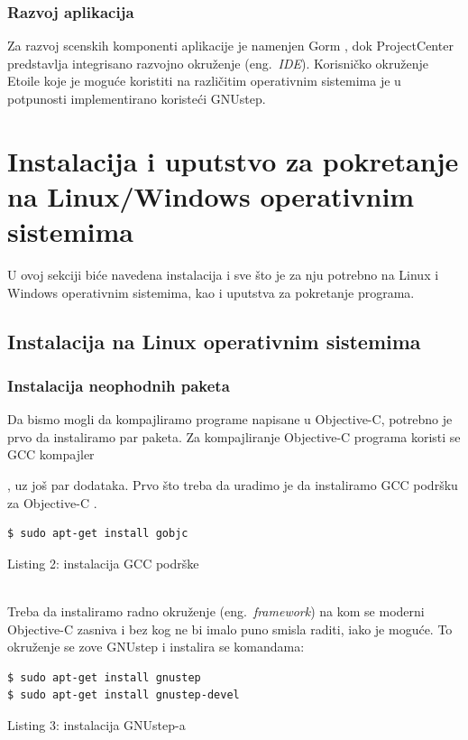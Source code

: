 \documentclass[a4paper]{article}
\begin{document}
{\subsubsection{Razvoj aplikacija}
Za razvoj scenskih komponenti aplikacije je namenjen Gorm \cite{gorm}, dok ProjectCenter \cite{projectcenter} predstavlja integrisano razvojno okruženje (eng.~{\em IDE}).   
Korisničko okruženje Etoile \cite{etoile} koje je moguće koristiti na različitim operativnim sistemima je u potpunosti implementirano koristeći GNUstep. 
  
\section{Instalacija i uputstvo za pokretanje na Linux/Windows operativnim sistemima}
\label{sec:instalacija}
U ovoj sekciji biće navedena instalacija i sve što je za nju potrebno na Linux i Windows operativnim sistemima, kao i uputstva za pokretanje programa.
\subsection{Instalacija na Linux operativnim sistemima}
\subsubsection{Instalacija neophodnih paketa}
Da bismo mogli da kompajliramo programe napisane u Objective-C, potrebno je prvo da instaliramo
par paketa. Za kompajliranje Objective-C programa koristi se GCC kompajler{\cite{gcc}, uz još par
dodataka.
Prvo što treba da uradimo je da instaliramo GCC podršku za Objective-C \cite{objectivecandgnustep}.

\begin{lstlisting}[frame=single]
$ sudo apt-get install gobjc
\end{lstlisting}
\caption{Listing 2: instalacija GCC podrške} \\


Treba da instaliramo radno okruženje (eng.~{\em framework}) na kom se moderni Objective-C zasniva i bez kog ne bi imalo puno smisla raditi, iako je moguće.
To okruženje se zove GNUstep \cite{gnustep} i instalira se komandama:
\begin{lstlisting}[frame=single]
$ sudo apt-get install gnustep
$ sudo apt-get install gnustep-devel
\end{lstlisting}
\caption{Listing 3: instalacija GNUstep-a} \\

}}
\end{document}
